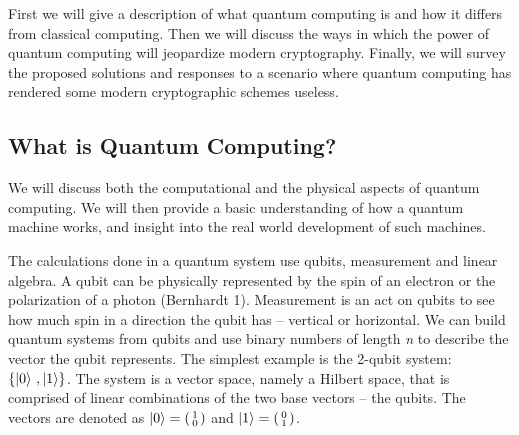\documentclass[11pt]{article}
\DeclarePairedDelimiter\qb{\lvert}{\rangle}
\newcommand{\icol}[1]{
  \left(\begin{smallmatrix}#1\end{smallmatrix}\right)
}
\begin{document}


First we will give a description of what quantum computing is and how it differs from classical computing. Then we will discuss the ways in which the power of quantum computing will jeopardize modern cryptography. Finally, we will survey the proposed solutions and responses to a scenario where quantum computing has rendered some modern cryptographic schemes useless.

\subsection{What is Quantum Computing?}


We will discuss both the computational and the physical aspects of quantum computing.
We will then provide a basic understanding of how a quantum machine works, and insight into
the real world development of such machines.

  
  The calculations done in a quantum system use qubits, measurement and linear algebra.
  A qubit can be physically represented by the spin of an electron or the polarization of a photon (Bernhardt 1).
  Measurement is an act on qubits to see how much spin in a direction the qubit has
  --  vertical or horizontal.
  We can build quantum systems from qubits and use binary numbers of
  length \emph{n} to describe the vector the qubit represents. 
  The simplest example is the 2-qubit system: $\{ \qb{0} \ , \qb{1} \}$.
  The system is a vector space, namely a Hilbert space, that is comprised of linear combinations of the two base vectors -- the qubits.
   The vectors are denoted as $\qb{0} = \icol{1\\0}$ and $\qb{1} = \icol{0\\1}$.
\end{document}
